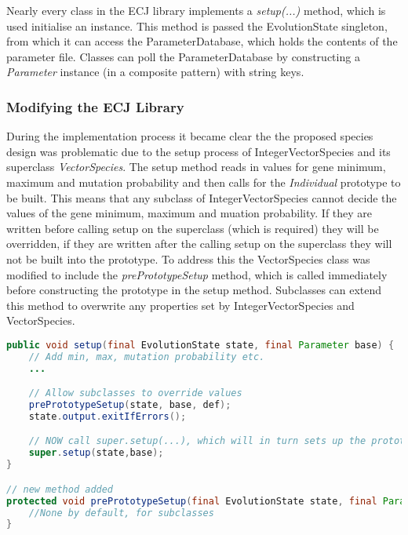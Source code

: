 \vspace{\baselineskip}

Nearly every class in the ECJ library implements a \emph{setup(...)} method, which is used initialise an instance. This method is passed the EvolutionState singleton, from which it can access the ParameterDatabase, which holds the contents of the parameter file. Classes can poll the ParameterDatabase by constructing a \emph{Parameter} instance (in a composite pattern) with string keys.

\subsubsection{Modifying the ECJ Library}
\label{subsec:ecjmod}

During the implementation process it became clear the the proposed species design was problematic due to the setup process of IntegerVectorSpecies and its superclass \emph{VectorSpecies}. The setup method reads in values for gene minimum, maximum and mutation probability and then calls for the \emph{Individual} prototype to be built. This means that any subclass of IntegerVectorSpecies cannot decide the values of the gene minimum, maximum and muation probability. If they are written before calling setup on the superclass (which is required) they will be overridden, if they are written after the calling setup on the superclass they will not be built into the prototype. To address this the VectorSpecies class was modified to include the \emph{prePrototypeSetup} method, which is called immediately before constructing the prototype in the setup method. Subclasses can extend this method to overwrite any properties set by IntegerVectorSpecies and VectorSpecies.

\begin{minipage}{0.9\linewidth}
\centering
\begin{lstlisting}[language=java]
public void setup(final EvolutionState state, final Parameter base) {
    // Add min, max, mutation probability etc.
    ...

    // Allow subclasses to override values
    prePrototypeSetup(state, base, def);
    state.output.exitIfErrors();          

    // NOW call super.setup(...), which will in turn sets up the prototypical individual
    super.setup(state,base);
}

// new method added
protected void prePrototypeSetup(final EvolutionState state, final Parameter base, final Parameter def) {
    //None by default, for subclasses
}
\end{lstlisting}
\end{minipage}

